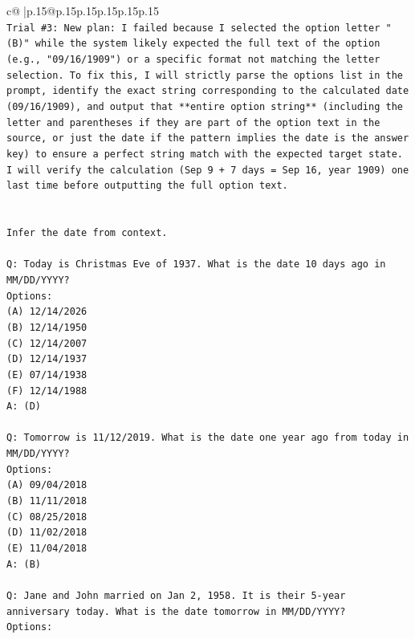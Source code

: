 \documentclass{article}
\begin{document}
{\begin{supertabular}{c@{$\;$}|p{.15\linewidth}@{}p{.15\linewidth}p{.15\linewidth}p{.15\linewidth}p{.15\linewidth}p{.15\linewidth}}
{{{\\ 
\texttt{Trial \#3: New plan: I failed because I selected the option letter "(B)" while the system likely expected the full text of the option (e.g., "09/16/1909") or a specific format not matching the letter selection. To fix this, I will strictly parse the options list in the prompt, identify the exact string corresponding to the calculated date (09/16/1909), and output that **entire option string** (including the letter and parentheses if they are part of the option text in the source, or just the date if the pattern implies the date is the answer key) to ensure a perfect string match with the expected target state. I will verify the calculation (Sep 9 + 7 days = Sep 16, year 1909) one last time before outputting the full option text.} \\
\\ 
\\ 
\texttt{Infer the date from context.} \\
\\ 
\texttt{Q: Today is Christmas Eve of 1937. What is the date 10 days ago in MM/DD/YYYY?} \\
\texttt{Options:} \\
\texttt{(A) 12/14/2026} \\
\texttt{(B) 12/14/1950} \\
\texttt{(C) 12/14/2007} \\
\texttt{(D) 12/14/1937} \\
\texttt{(E) 07/14/1938} \\
\texttt{(F) 12/14/1988} \\
\texttt{A: (D)} \\
\\ 
\texttt{Q: Tomorrow is 11/12/2019. What is the date one year ago from today in MM/DD/YYYY?} \\
\texttt{Options:} \\
\texttt{(A) 09/04/2018} \\
\texttt{(B) 11/11/2018} \\
\texttt{(C) 08/25/2018} \\
\texttt{(D) 11/02/2018} \\
\texttt{(E) 11/04/2018} \\
\texttt{A: (B)} \\
\\ 
\texttt{Q: Jane and John married on Jan 2, 1958. It is their 5{-}year anniversary today. What is the date tomorrow in MM/DD/YYYY?} \\
\texttt{Options:} \\
}}}
\end{supertabular}}
\end{document}
